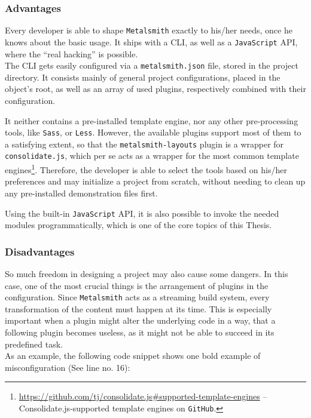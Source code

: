 \subsubsection{Advantages}
Every developer is able to shape \texttt{Metalsmith} exactly to his/her needs, once he knows about the basic usage. It ships with a CLI, as well as a \texttt{JavaScript} API, where the ``real hacking'' is possible.\\
The CLI gets easily configured via a \texttt{metalsmith.json} file, stored in the project directory. It consists mainly of general project configurations, placed in the object's root, as well as an array of used plugins, respectively combined with their configuration.

It neither contains a pre-installed template engine, nor any other pre-processing tools, like \texttt{Sass}, or \texttt{Less}. However, the available plugins support most of them to a satisfying extent, so that the \texttt{metalsmith-layouts} plugin is a wrapper for \texttt{consolidate.js}, which per se acts as a wrapper for the most common template engines\footnote{\url{https://github.com/tj/consolidate.js\#supported-template-engines} -- Consolidate.js-supported template engines on \texttt{GitHub}.}. Therefore, the developer is able to select the tools based on his/her preferences and may initialize a project from scratch, without needing to clean up any pre-installed demonstration files first.

Using the built-in \texttt{JavaScript} API, it is also possible to invoke the needed modules programmatically, which is one of the core topics of this Thesis.

\subsubsection{Disadvantages}
So much freedom in designing a project may also cause some dangers. In this case, one of the most crucial things is the arrangement of plugins in the configuration. Since \texttt{Metalsmith} acts as a streaming build system, every transformation of the content must happen at its time. This is especially important when a plugin might alter the underlying code in a way, that a following plugin becomes useless, as it might not be able to succeed in its predefined task.\\
As an example, the following code snippet shows one bold example of misconfiguration (See line no. 16):


